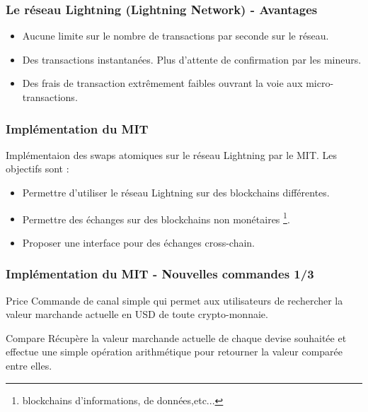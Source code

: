 \begin{frame}
  \frametitle{Le réseau Lightning (Lightning Network) - Avantages}
  \begin{itemize}
    \item Aucune limite sur le nombre de transactions par seconde sur le réseau.
    \newline
    \item Des transactions instantanées. Plus d’attente de confirmation par les mineurs.
    \newline
    \item Des frais de transaction extrêmement faibles ouvrant la voie aux micro-transactions.
  \end{itemize}
\end{frame}

\begin{frame}
  \frametitle{Implémentation du MIT}
Implémentaion des swaps atomiques sur le réseau Lightning par le MIT. Les objectifs sont :
\newline
\begin{itemize}
  \item Permettre d'utiliser le réseau Lightning sur des blockchains différentes.
  \item Permettre des échanges sur des blockchains non monétaires \footnote{blockchains d'informations, de données,etc...}.
  \item Proposer une interface pour des échanges cross-chain.
\end{itemize}  

\end{frame}

\begin{frame}
  \frametitle{Implémentation du MIT - Nouvelles commandes 1/3}
  \begin{block}{Price}
    Commande de canal simple qui permet aux utilisateurs de rechercher la valeur marchande actuelle en USD de toute crypto-monnaie. 
  \end{block}
  \begin{block}{Compare}
    Récupère  la valeur marchande actuelle de chaque devise souhaitée et effectue une
   simple opération arithmétique pour retourner la valeur comparée entre elles.
  \end{block}
  
\end{frame}

